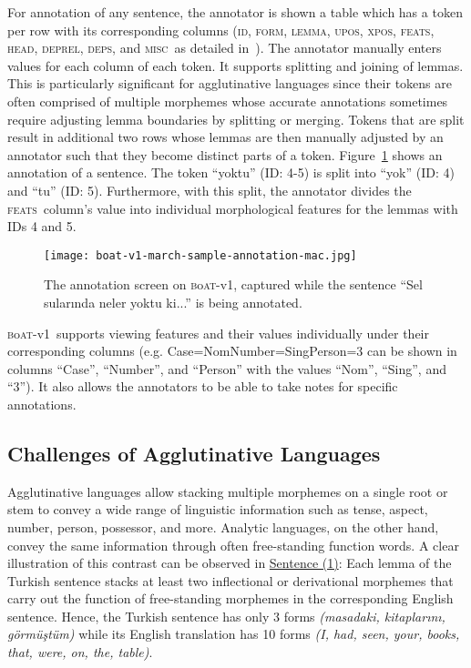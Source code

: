 \documentclass{elektr}
\newcommand{\boatvone}{\textsc{b}o\textsc{at}-{\scriptsize v1}}
\newcommand{\id}{\textsc{id}}
\newcommand{\form}{\textsc{form}}
\newcommand{\udlemma}{\textsc{lemma}}
\newcommand{\upos}{\textsc{upos}}
\newcommand{\xpos}{\textsc{xpos}}
\newcommand{\feats}{\textsc{feats}}
\newcommand{\head}{\textsc{head}}
\newcommand{\deprel}{\textsc{deprel}}
\newcommand{\deps}{\textsc{deps}}
\newcommand{\misc}{\textsc{misc}}
\begin{document}
For annotation of any sentence, the annotator is shown a table which has a token per row with its corresponding columns (\id, \form, \udlemma, \upos, \xpos, \feats, \head, \deprel, \deps, and \misc\ as detailed in~\cite{anon}).
The annotator manually enters values for each column of each token.
It supports splitting and joining of lemmas.
This is particularly significant for agglutinative languages since their tokens are often comprised of multiple morphemes whose accurate annotations sometimes require adjusting lemma boundaries by splitting or merging.
Tokens that are split result in additional two rows whose lemmas are then manually adjusted by an annotator such that they become distinct parts of a token.
Figure~\ref{fig:anno-fig-v1} shows an annotation of a sentence.
The token ``yoktu'' (ID: 4-5) is split into ``yok'' (ID: 4) and ``tu'' (ID: 5).
Furthermore, with this split, the annotator divides the \feats\ column's value into individual morphological features for the lemmas with IDs 4 and 5.

\begin{figure}[th!]
    \centering
        \texttt{[image: boat-v1-march-sample-annotation-mac.jpg]}
        \caption{The annotation screen on \boatvone, captured while the sentence ``Sel sularında neler yoktu ki...'' is being annotated.}
        \label{fig:anno-fig-v1}
\end{figure}

\boatvone\ supports viewing features and their values individually under their corresponding columns (e.g. Case=Nom\textbar Number=Sing\textbar Person=3 can be shown in columns ``Case'', ``Number'', and ``Person'' with the values ``Nom'', ``Sing'', and ``3'').
It also allows the annotators to be able to take notes for specific annotations.

\subsection{Challenges of Agglutinative Languages}
\label{sec:challenges}
Agglutinative languages allow stacking multiple morphemes on a single root or stem to convey a wide range of linguistic information such as tense, aspect, number, person, possessor, and more.
Analytic languages, on the other hand, convey the same information through often free-standing function words.
A clear illustration of this contrast can be observed in \hyperref[trex]{Sentence (1)}: Each lemma of the Turkish sentence stacks at least two inflectional or derivational morphemes that carry out the function of free-standing morphemes in the corresponding English sentence.
Hence, the Turkish sentence has only 3 forms \textit{(masadaki, kitaplarını, görmüştüm)} while its English translation has 10 forms \textit{(I, had, seen, your, books, that, were, on, the, table)}.
\end{document}
